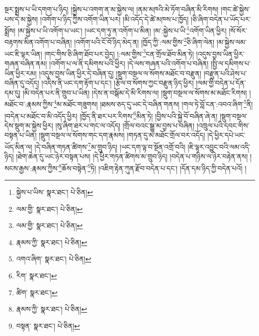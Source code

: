 སྔར་སྨྲས་པ་ཡི་དགག་པ་ཉིད། །སྐྱེས་པ་འགག་ན་མ་སྐྱེས་ལ། །ནམ་མཁའི་མེ་ཏོག་བཞིན་མི་རིགས། །གང་ཚེ་སྐྱེས་པས་དེ་མ་སྐྱེས། །འགོག་པ་ཉིད་ཀྱིས་འགོག་ཡིན་པར། །མི་འདོད་དེ་ཚེ་མཁས་པ་ཁྱོད། །ཅི་ཞིག་བདེན་པ་ཡོད་པར་སྨྲོས། །མ་སྐྱེས་པ་ཡི་འགོག་པ་ཡང་། །ཡང་དག་ཏུ་ན་འགོག་པ་མིན། །མ་:སྐྱེས་པ་ཡི་\footnote{སྐྱེས་པ་ཡིས་  སྣར་ཐང་།  པེ་ཅིན། }འགོག་ཡིན་ཕྱིར། །སོ་སོར་བརྟགས་མིན་འགོག་པ་བཞིན། །འགོག་པའི་ངོ་བོ་ཉིད་མེད་ན། །ཁྱོད་ཀྱི་:ལམ་གྱིས་\footnote{ལམ་གྱི་  སྣར་ཐང་།  པེ་ཅིན། }ཅི་ཞིག་ལེན། །མ་སྐྱེས་ལམ་ཡང་ཇི་ལྟར་ཡིན། །གང་གིས་ཅི་ཞིག་ཐོབ་པར་བྱེད། །:ལམ་གྱིས་\footnote{ལམ་གྱི་  སྣར་ཐང་།  པེ་ཅིན། }ངན་གྲོལ་ཐོབ་མིན་ཏེ། །འདུས་བྱས་ཡིན་ཕྱིར་གཞན་བཞིན་ནམ། །འགོག་པ་ལ་ནི་དམིགས་པའི་ཕྱིར། །དེ་ལས་གཞན་པའི་འགོག་པ་བཞིན། །སྤྱི་ལ་དམིགས་པ་ཡིན་ཕྱིར་རམ། །འདུས་བྱས་ཡིན་ཕྱིར་དེ་བཞིན་དུ། །སྡུག་བསྔལ་ལ་སོགས་མཐོང་བ་བརྫུན། །བརྫུན་པའི་ཤེས་པ་བཞིན་དུ་འདོད། །འདིས་ནི་ཡང་དག་རྟོག་པ་དང་། །རྩོལ་བ་སོགས་ཀྱང་བརྫུན་ཉིད་ཕྱིར། །ལམ་གྱི་བདེན་པ་དོན་དམ་དུ། །མི་བདེན་པར་ནི་གྲུབ་པ་ཡིན། །དེས་ན་བསྒོམ་དེ་མི་རིགས་ལ། །སྡུག་བསྔལ་ལ་སོགས་མ་མཐོང་རིགས། །མཐོང་བ་:རྣམས་ཀྱིས་\footnote{རྣམས་ཀྱི་  སྣར་ཐང་།  པེ་ཅིན། }མ་མཐོང་གཟུགས། །ཐམས་ཅད་དུ་ཡང་དེ་བཞིན་གནས། །གལ་ཏེ་བློ་ངན་:འབའ་ཞིག་\footnote{འགའ་ཞིག་  སྣར་ཐང་།  པེ་ཅིན། }ནི། །བདེན་པ་མཐོང་བ་མི་འདོད་ཕྱིར། །ཁྱོད་ནི་ཐར་པར་རིགས་\footnote{རིག་  སྣར་ཐང་། }མིན་ཏེ། །བྱིས་པའི་སྐྱེ་བོ་བཞིན་ཞེ་ན། །སྡུག་བསྔལ་དེས་སྡུག་མ་སྐྱེས་ཕྱིར། །སུ་ཞིག་ཐར་པ་གང་ལ་འདོད། །གྲོལ་བའང་སྒྱུ་མ་བྱས་པ་བཞིན། །འཁྲུལ་པའི་དབང་གིས་བསྟན་པ་ཡིན། །སྡུག་བསྔལ་ལ་སོགས་གང་དག་རྣམས། །གཏན་དུ་མ་མཐོང་གྲོལ་བར་འདོད། །དེ་ཕྱིར་དཔེ་ཡང་ཡོད་མིན་ལ། །དེ་བཞིན་གཏན་ཚིགས་\footnote{ཚིག་  སྣར་ཐང་། }མ་གྲུབ་ཉིད། །ཡང་དག་ལྟ་བ་སྔོན་འགྲོ་བའི། །ཇི་ལྟར་འབྱུང་བའི་ལམ་འདི་ཉིད། །ཐེག་ཆེན་དུ་ཡང་ཉེར་བསྟན་པས། །དེ་ཕྱིར་གཏན་ཚིགས་མ་གྲུབ་ཉིད། །བདེན་པ་གཉིས་ལ་ཉེར་བརྟེན་ནས། །སངས་རྒྱས་:རྣམས་ཀྱིས་\footnote{རྣམས་ཀྱི་  སྣར་ཐང་།  པེ་ཅིན། }ཆོས་བསྟེན་\footnote{བསྟན་  སྣར་ཐང་།  པེ་ཅིན། }ཏེ། །འཇིག་རྟེན་ཀུན་རྫོབ་བདེན་པ་དང་། །དོན་དམ་ཉིད་ཀྱི་བདེན་པའོ། །
